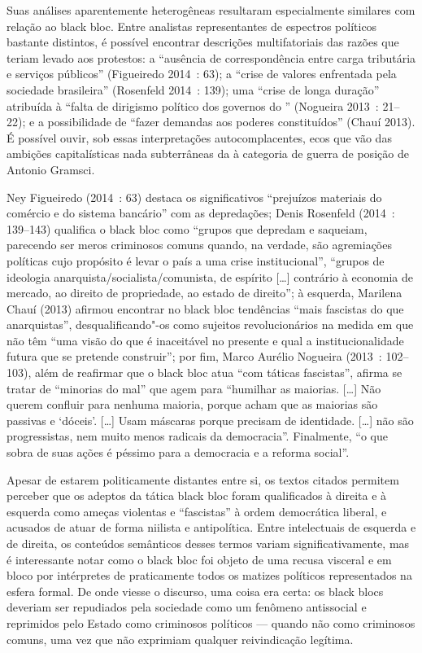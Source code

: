 Suas análises aparentemente heterogêneas resultaram especialmente
similares com relação ao black bloc. Entre analistas representantes de
espectros políticos bastante distintos, é possível encontrar descrições
multifatoriais das razões que teriam levado aos protestos: a ``ausência
de correspondência entre carga tributária e serviços públicos''
(Figueiredo 2014~: 63); a ``crise de valores enfrentada pela sociedade
brasileira'' (Rosenfeld 2014~: 139); uma ``crise de longa duração''
atribuída à ``falta de dirigismo político dos governos do '' (Nogueira
2013~: 21--22); e a possibilidade de ``fazer demandas aos poderes
constituídos'' (Chauí 2013). É possível ouvir, sob essas
interpretações autocomplacentes, ecos que vão das ambições
capitalísticas nada subterrâneas da  à categoria de guerra de
posição de Antonio Gramsci.

Ney Figueiredo (2014~: 63) destaca os significativos ``prejuízos
materiais do comércio e do sistema bancário'' com as depredações; Denis
Rosenfeld (2014~: 139--143) qualifica o black bloc como ``grupos
que depredam e saqueiam, parecendo ser meros criminosos comuns quando,
na verdade, são agremiações políticas cujo propósito é levar o país a
uma crise institucional'', ``grupos de ideologia
anarquista/socialista/comunista, de espírito {[}\ldots{}{]} contrário à
economia de mercado, ao direito de propriedade, ao estado de direito'';
à esquerda, Marilena Chauí (2013) afirmou encontrar no black bloc
tendências ``mais fascistas do que anarquistas'', desqualificando"-os
como sujeitos revolucionários na medida em que não têm ``uma visão do
que é inaceitável no presente e qual a institucionalidade futura que se
pretende construir''; por fim, Marco Aurélio Nogueira (2013~: 102--103),
além de reafirmar que o black bloc atua ``com táticas
fascistas'', afirma se tratar de ``minorias do mal'' que agem para
``humilhar as maiorias. {[}\ldots{}{]} Não querem confluir para nenhuma
maioria, porque acham que as maiorias são passivas e `dóceis'.
{[}\ldots{}{]} Usam máscaras porque precisam de identidade.
{[}\ldots{}{]} não são progressistas, nem muito menos radicais da
democracia''. Finalmente, ``o que sobra de suas ações é
péssimo para a democracia e a reforma social''.

Apesar de estarem politicamente distantes entre si, os textos citados
permitem perceber que os adeptos da tática black bloc foram qualificados
à direita e à esquerda como ameças violentas e ``fascistas'' à ordem
democrática liberal, e acusados de atuar de forma niilista e
antipolítica. Entre intelectuais de esquerda e de direita, os conteúdos
semânticos desses termos variam significativamente, mas é interessante
notar como o black bloc foi objeto de uma recusa visceral e em bloco por
intérpretes de praticamente todos os matizes políticos representados na
esfera formal. De onde viesse o discurso, uma coisa era certa: os black
blocs deveriam ser repudiados pela sociedade como um fenômeno
antissocial e reprimidos pelo Estado como criminosos políticos --- quando
não como criminosos comuns, uma vez que não exprimiam qualquer
reivindicação legítima.

